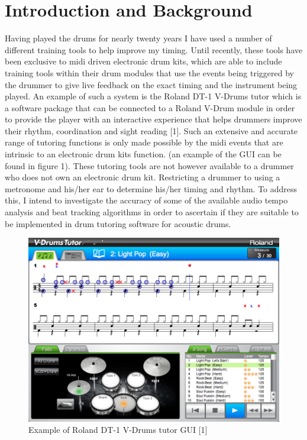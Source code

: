 \documentclass[a4paper, 11pt]{article}
\begin{document}
\maketitle{} \section{Introduction and Background}
Having played the drums for nearly twenty years I have used a number of different training tools to help improve my timing. Until recently, these tools have been exclusive to midi driven electronic drum kits, which are able to include training tools within their drum modules that use the events being triggered by the drummer to give live feedback on the exact timing and the instrument being played. An example of such a system is the Roland DT-1 V-Drums tutor which is a software package that can be connected to a Roland V-Drum module in order to provide the player with an interactive experience that helps drummers improve their rhythm, coordination and sight reading [1]. Such an extensive and accurate range of tutoring functions is only made possible by the midi events that are intrinsic to an electronic drum kits function. (an example of the GUI can be found in figure 1). These tutoring tools are not however available to a drummer who does not own an electronic drum kit. Restricting a drummer to using a metronome and his/her ear to determine his/her timing and rhythm. To address this, I intend to investigate the accuracy of some of the available audio tempo analysis and beat tracking algorithms in order to ascertain if they are suitable to be implemented in drum tutoring software for acoustic drums.
\begin{figure}[h]
\caption{Example of Roland DT-1 V-Drums tutor GUI [1]}
	\centering
	\includegraphics[scale=0.25]{dt-1_ss_main_notation_gal}
\end{figure}
\end{document}
